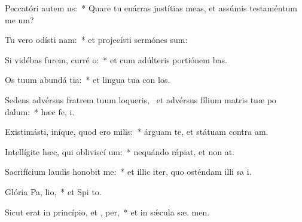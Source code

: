 \item Peccatóri autem  us:~* Quare tu enárras justítias meas, et assúmis testaméntum me   um?
\item Tu vero odísti nam:~* et projecísti sermónes  sum:
\item Si vidébas furem, curré  o:~* et cum adúlteris portiónem  bas.
\item Os tuum abundá tia:~* et lingua tua con los.
\item Sedens advérsus fratrem tuum loqueris,~\pscross{} et advérsus fílium matris tuæ po dalum:~* hæc fe,  i.
\item Existimásti, iníque, quod ero  milis:~* árguam te, et státuam contra  am.
\item Intellígite hæc, qui obliviscí um:~* nequándo rápiat, et non   at.
\item Sacrifícium laudis honobit me:~* et illic iter, quo osténdam illi sa i.
\item Glória Pa,  lio,~* et Spi to.
\item Sicut erat in princípio, et ,  per,~* et in sǽcula sæ. men.
